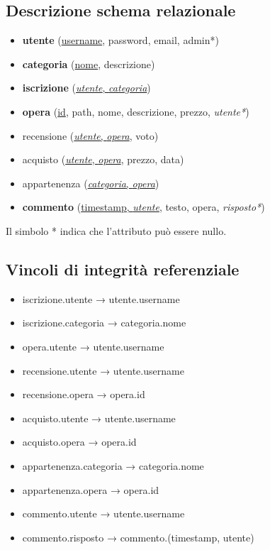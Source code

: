 \documentclass[10pt]{article}
\begin{document}
\subsection{Descrizione schema relazionale}
\begin{itemize}
    \item \textbf{utente} (\underline{username}, password, email, admin*)
    \item \textbf{categoria} (\underline{nome}, descrizione)
    \item \textbf{iscrizione} (\underline{\textit{utente}, \textit{categoria}})
    \item \textbf{opera} (\underline{id}, path, nome, descrizione, prezzo, \textit{utente*})
    \item recensione (\underline{\textit{utente}, \textit{opera}}, voto)
    \item acquisto (\underline{\textit{utente}, \textit{opera}}, prezzo, data)
    \item appartenenza (\underline{\textit{categoria}, \textit{opera}})
    \item \textbf{commento} (\underline{timestamp, \textit{utente}}, testo, opera, \textit{risposto*})
\end{itemize}
Il simbolo * indica che l'attributo può essere nullo.

\subsection{Vincoli di integrità referenziale }
\begin{itemize}
    \item iscrizione.utente → utente.username
    \item iscrizione.categoria → categoria.nome
    \item opera.utente → utente.username
    \item recensione.utente → utente.username
    \item recensione.opera → opera.id
    \item acquisto.utente → utente.username
    \item acquisto.opera → opera.id
    \item appartenenza.categoria → categoria.nome
    \item appartenenza.opera → opera.id
    \item commento.utente → utente.username
    \item commento.risposto → commento.(timestamp, utente)
\end{itemize}
\end{document}
